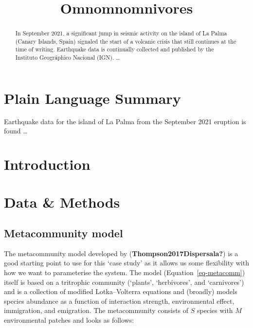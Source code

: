 \documentclass[
]{agujournal2019}
\begin{document}
\title{Omnomnomnivores}



\begin{abstract}
In September 2021, a significant jump in seismic activity on the island
of La Palma (Canary Islands, Spain) signaled the start of a volcanic
crisis that still continues at the time of writing. Earthquake data is
continually collected and published by the Instituto Geográphico
Nacional (IGN). \ldots{}
\end{abstract}

\section*{Plain Language Summary}
Earthquake data for the island of La Palma from the September 2021
eruption is found \ldots{}



\section{Introduction}\label{introduction}

\section{Data \& Methods}\label{sec-data-methods}

\subsection{Metacommunity model}\label{metacommunity-model}

The metacommunity model developed by (\textbf{Thompson2017Dispersala?})
is a good starting point to use for this `case study' as it allows us
some flexibility with how we want to parameterise the system. The model
(Equation~\ref{eq-metacomm}) itself is based on a tritrophic community
(`plants', `herbivores', and `carnivores') and is a collection of
modified Lotka--Volterra equations and (broadly) models species
abundance as a function of interaction strength, environmental effect,
immigration, and emigration. The metacommunity consists of \(S\) species
with \(M\) environmental patches and looks as follows:
\end{document}
